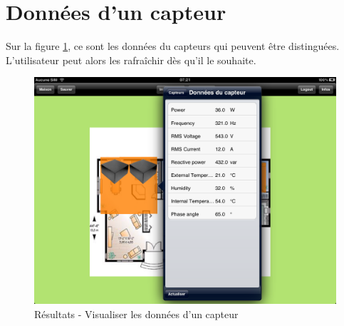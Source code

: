 \section{Données d'un capteur} %
\label{sec:donn_es_d_un_capteur}
Sur la figure \ref{gra:res13}, ce sont les données du capteurs qui peuvent être distinguées. L'utilisateur peut alors les rafraîchir dès qu'il le souhaite.
\begin{figure}[H]
        \centering
        \includegraphics[width=\textwidth]{00_media/07_13.PNG}
        \caption{Résultats - Visualiser les données d'un capteur}
        \label{gra:res13}
\end{figure}

